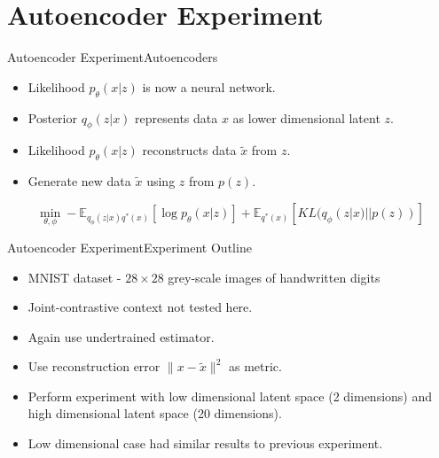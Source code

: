\documentclass{beamer}
\begin{document}
\section{Autoencoder Experiment}
\begin{frame}{Autoencoder Experiment}{Autoencoders}
\begin{itemize}
\item Likelihood $p_\theta(x|z)$ is now a neural network.
\item Posterior $q_\phi(z|x)$ represents data $x$ as lower dimensional latent $z$.
\item Likelihood $p_\theta(x|z)$ reconstructs data $\tilde{x}$ from $z$.
\item Generate new data $\tilde{x}$ using $z$ from $p(z)$.
\end{itemize}
\begin{figure}[h]
  \centering
\end{figure}
\[\min_{\theta, \phi} -\mathbb{E}_{q_\phi(z|x)q^*(x)}[\log p_\theta(x|z)]+\mathbb{E}_{q^*(x)}[KL(q_\phi(z|x)||p(z))]\]
\end{frame}
\begin{frame}{Autoencoder Experiment}{Experiment Outline}
\begin{itemize}
\item MNIST dataset - $28\times 28$ grey-scale images of handwritten digits
\item Joint-contrastive context not tested here.
\item Again use undertrained estimator.
\item Use reconstruction error $\|x-\tilde{x}\|^2$ as metric.
\item Perform experiment with low dimensional latent space (2 dimensions) and high dimensional latent space (20 dimensions).
\item Low dimensional case had similar results to previous experiment.
\end{itemize}
\end{frame}
\end{document}
